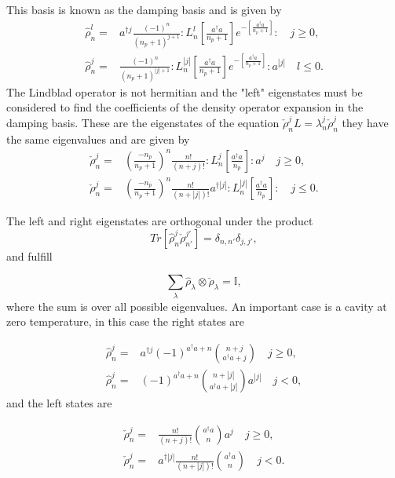 \documentclass[reprint, amsmath,amssymb, aps,pra]{revtex4-1}
\begin{document}
This basis is known as the damping basis \cite{EnglertDB} and is given by
\begin{align}\label{DefDB}
\hat{\rho}_n^l=&a^{\dagger j}\frac{(-1)^n}{(n_p+1)^{j+1}}:L_n^l[\frac{a^\dagger a}{n_p+1}]e^{-[\frac{a^\dagger a}{n_p+1}]}:\quad j \geq 0, \\
\hat{\rho}_n^j=&\frac{(-1)^n}{(n_p+1)^{|j|+1}}:L_n^{|j|}[\frac{a^\dagger a}{n_p+1}]e^{-[\frac{a^\dagger a}{n_p+1}]}:a^{|j|}\quad l \leq 0.
\end{align}
The Lindblad operator is not hermitian and the "left" eigenstates must
be considered to find the coefficients of the density operator
expansion in the damping basis. These are the eigenstates of the
equation $\check{\rho}_n^jL = \lambda_n^j\check{\rho}_n^j$ they have
the same eigenvalues and are given by
\begin{align}\label{DefDBDual}
\check{\rho}_n^j=&(\frac{-n_p}{n_p+1})^n\frac{n!}{(n+j)!}:L_n^j[\frac{a^\dagger a}{n_p}]:a^{j}\quad j \geq 0, \\
\check{\rho}_n^j=&(\frac{-n_p}{n_p+1})^n\frac{n!}{(n+|j|)!}a^{\dagger|j|}:L_n^{|j|}[\frac{a^\dagger a}{n_p}]:\quad j \leq 0.
\end{align}

The left and right eigenstates are orthogonal under the product
\begin{equation}
Tr[\hat{\rho}_n^j\check{\rho}_{n'}^{j'}] = \delta_{n,n'}\delta_{j,j'},
\end{equation} and fulfill

\begin{equation}\label{DampingBasisCompleteness}
\sum_{\lambda} \hat{\rho}_\lambda \otimes \check{\rho}_\lambda = \mathbb{I},
\end{equation} where the sum is over all possible eigenvalues. An important case is a cavity at zero temperature, in this case the right states are \cite{EnglertDB}

\begin{align}\label{DefDBZero}
\hat{\rho}_n^j=&a^{\dagger j}(-1)^{a^\dagger a + n}\binom{n+j}{a^\dagger a+j} \quad j \geq 0, \\
\hat{\rho}_n^j=&(-1)^{a^\dagger a + n}\binom{n+|j|}{a^\dagger a+|j|}a^{|j|} \quad j < 0,
\end{align} and the left states are

\begin{align}\label{DefDBDualZero}
\check{\rho}_n^j=&\frac{n!}{(n+j)!}\binom{a^\dagger a}{n}a^j \quad j \geq 0, \\
\check{\rho}_n^j=&a^{\dagger|j|}\frac{n!}{(n+|j|)!}\binom{a^\dagger a}{n} \quad j < 0.
\end{align}
\end{document}
